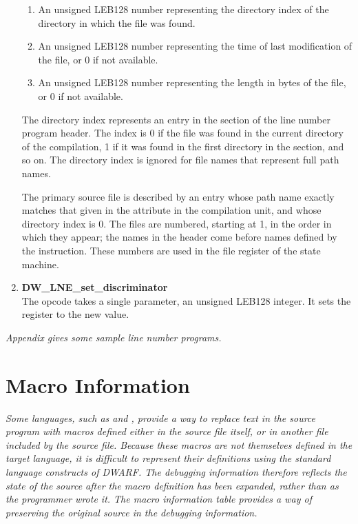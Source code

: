 \begin{enumerate}[1. ]
\begin{enumerate}[1. ]
\item An unsigned LEB128 
number representing the directory index
of the directory in which the file was found.  

\item An unsigned LEB128 
number representing the time of last modification
of the file, or 0 if not available.  

\item An unsigned LEB128
number representing the length in bytes of the file, or 0 if
not available.
\end{enumerate}

The directory index represents an entry in the
 section of the line number program
header. The index is 0 if the file was found in the current
directory of the compilation, 1 if it was found in the first
directory in the  section,
and so on. The
directory index is ignored for file names that represent full
path names.

The primary source file is described by an entry whose path
name exactly matches that given in the  attribute
in the compilation unit, and whose directory index is 0. The
files are numbered, starting at 1, in the order in which they
appear; the names in the header come before names defined by
the  instruction. These numbers are used
in the file register of the state machine.

\item \textbf{DW\_LNE\_set\_discriminator} \\
The 
opcode takes a single
parameter, an unsigned LEB128 
integer. It sets the
 register to the new value.

\end{enumerate}

\textit{Appendix  
gives some sample line number programs.}

\section{Macro Information}
\label{chap:macroinformation}
\textit{Some languages, such as 
 and 
, provide a way to replace
text in the source program with macros defined either in the
source file itself, or in another file included by the source
file.  Because these macros are not themselves defined in the
target language, it is difficult to represent their definitions
using the standard language constructs of DWARF. The debugging
information therefore reflects the state of the source after
the macro definition has been expanded, rather than as the
programmer wrote it. The macro information table provides a way
of preserving the original source in the debugging information.}


